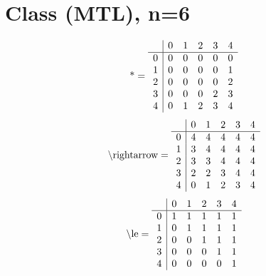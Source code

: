 \documentclass[11pt]{article}
\begin{document}
\section{Class (MTL), n=6}
\[\text{*} = 
\begin{array}{r | r r r r r}
 & 0 & 1 & 2 & 3 & 4 \\ \hline
0 & 0 & 0 & 0 & 0 & 0 \\
1 & 0 & 0 & 0 & 0 & 1 \\
2 & 0 & 0 & 0 & 0 & 2 \\
3 & 0 & 0 & 0 & 2 & 3 \\
4 & 0 & 1 & 2 & 3 & 4 \\
\end{array}
\]
\[\text{\textbackslash rightarrow} = 
\begin{array}{r | r r r r r}
 & 0 & 1 & 2 & 3 & 4 \\ \hline
0 & 4 & 4 & 4 & 4 & 4 \\
1 & 3 & 4 & 4 & 4 & 4 \\
2 & 3 & 3 & 4 & 4 & 4 \\
3 & 2 & 2 & 3 & 4 & 4 \\
4 & 0 & 1 & 2 & 3 & 4 \\
\end{array}
\]
\[\text{\textbackslash le} = 
\begin{array}{r | r r r r r}
 & 0 & 1 & 2 & 3 & 4 \\ \hline
0 & 1 & 1 & 1 & 1 & 1 \\
1 & 0 & 1 & 1 & 1 & 1 \\
2 & 0 & 0 & 1 & 1 & 1 \\
3 & 0 & 0 & 0 & 1 & 1 \\
4 & 0 & 0 & 0 & 0 & 1 \\
\end{array}
\]
\end{document}
